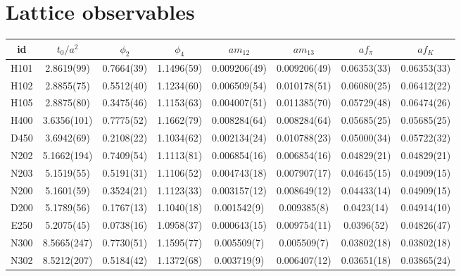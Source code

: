 
\chapter{Lattice observables}
\label{apex_obs}


\begin{sidewaystable}
\begin{center}
    \begin{tabular}{c c c c c c c c}
    id & $t_0/a^2$ & $\phi_2$ & $\phi_4$ & $am_{12}$ & $am_{13}$ & $af_{\pi}$ & $af_K$ \\
\toprule
H101 & 2.8619(99) & 0.7664(39) & 1.1496(59) & 0.009206(49) & 0.009206(49) & 0.06353(33) & 0.06353(33) \\
H102 & 2.8855(75) & 0.5512(40) & 1.1234(60) & 0.006509(54) & 0.010178(51) & 0.06080(25) & 0.06412(22) \\
H105 & 2.8875(80) & 0.3475(46) & 1.1153(63) & 0.004007(51) & 0.011385(70) & 0.05729(48) & 0.06474(26) \\
\midrule
H400 & 3.6356(101) & 0.7775(52) & 1.1662(79) & 0.008284(64) & 0.008284(64) & 0.05685(25) & 0.05685(25) \\
D450 & 3.6942(69) & 0.2108(22) & 1.1034(62) & 0.002134(24) & 0.010788(23) & 0.05000(34) & 0.05722(32) \\
\midrule
N202 & 5.1662(194) & 0.7409(54) & 1.1113(81) & 0.006854(16) & 0.006854(16) & 0.04829(21) & 0.04829(21) \\
N203 & 5.1519(55) & 0.5191(31) & 1.1106(52) & 0.004743(18) & 0.007907(17) & 0.04645(15) & 0.04909(15) \\
N200 & 5.1601(59) & 0.3524(21) & 1.1123(33) & 0.003157(12) & 0.008649(12) & 0.04433(14) & 0.04909(15) \\
D200 & 5.1789(56) & 0.1767(13) & 1.1040(18) & 0.001542(9) & 0.009385(8) & 0.0423(14) & 0.04914(10) \\
E250 & 5.2075(45) & 0.0738(16) & 1.0958(37) & 0.000643(15) & 0.009754(11) & 0.0396(52) & 0.04826(47) \\
\midrule
N300 & 8.5665(247) & 0.7730(51) & 1.1595(77) & 0.005509(7) & 0.005509(7) & 0.03802(18) & 0.03802(18) \\
N302 & 8.5212(207) & 0.5184(42) & 1.1372(68) & 0.003719(9) & 0.006407(12) & 0.03651(18) & 0.03865(24) \\

\end{tabular}
\end{center}
\end{sidewaystable}
